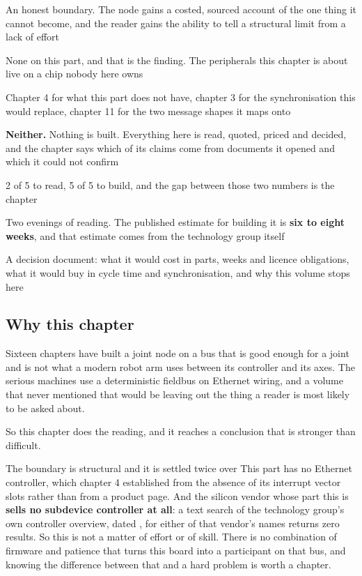 
\begin{keyfacts}
\item[Adds to the node] An honest boundary. The node gains a costed, sourced
account of the one thing it cannot become, and the reader gains the ability to
tell a structural limit from a lack of effort
\item[Peripherals] None on this part, and that is the finding. The peripherals
this chapter is about live on a chip nobody here owns
\item[Depends on] Chapter 4 for what this part does not have, chapter 3 for the
synchronisation this would replace, chapter 11 for the two message shapes it
maps onto
\item[Real or modelled] \textbf{Neither.} Nothing is built. Everything here is
read, quoted, priced and decided, and the chapter says which of its claims come
from documents it opened and which it could not confirm
\item[Difficulty] 2 of 5 to read, 5 of 5 to build, and the gap between those two
numbers is the chapter
\item[Effort] Two evenings of reading. The published estimate for building it is
\textbf{six to eight weeks}, and that estimate comes from the technology group
itself
\item[Deliverable] A decision document: what it would cost in parts, weeks and
licence obligations, what it would buy in cycle time and synchronisation, and
why this volume stops here
\end{keyfacts}

\subsection*{Why this chapter}

Sixteen chapters have built a joint node on a bus that is good enough for a
joint and is not what a modern robot arm uses between its controller and its
axes. The serious machines use a deterministic fieldbus on Ethernet wiring, and
a volume that never mentioned that would be leaving out the thing a reader is
most likely to be asked about.

So this chapter does the reading, and it reaches a conclusion that is stronger
than difficult.

\begin{note}{The boundary is structural and it is settled twice over}
This part has no Ethernet controller, which chapter 4 established from the
absence of its interrupt vector slots rather than from a product page. And the
silicon vendor whose part this is \textbf{sells no subdevice controller at
all}: a text search of the technology group's own controller overview, dated
, for either of that vendor's names returns zero results. So this is
not a matter of effort or of skill. There is no combination of firmware and
patience that turns this board into a participant on that bus, and knowing the
difference between that and a hard problem is worth a chapter.
\end{note}

